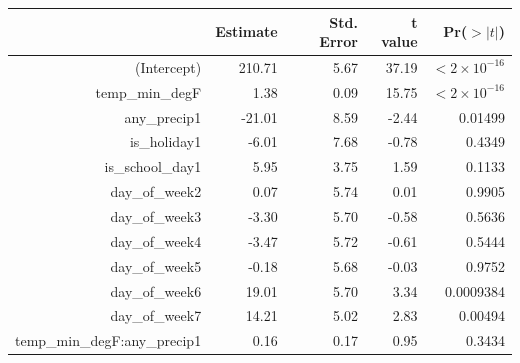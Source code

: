 \documentclass[11pt,notitlepage]{article}
\newenvironment{codeSmall}%
   {\par\noindent\adjustbox{margin=1ex,bgcolor=shadecolor,margin=0ex \medskipamount}\bgroup\minipage\linewidth\verbatim\footnotesize}%
   {\endverbatim\endminipage\egroup}
\begin{document}


\begin{table}[ht]
\footnotesize
\centering
\begin{tabular}{rrrrr}
  \hline
 & Estimate & Std. Error & t value & Pr($>|t|$) \\ 
  \hline
(Intercept) & 210.71 & 5.67 & 37.19 & $<2 \times 10^{-16}$ \\ 
  temp\_min\_degF & 1.38 & 0.09 & 15.75 & $<2 \times 10^{-16}$ \\ 
  any\_precip1 & -21.01 & 8.59 & -2.44 & 0.01499 \\ 
  is\_holiday1 & -6.01 & 7.68 & -0.78 & 0.4349 \\ 
  is\_school\_day1 & 5.95 & 3.75 & 1.59 & 0.1133 \\ 
  day\_of\_week2 & 0.07 & 5.74 & 0.01 & 0.9905 \\ 
  day\_of\_week3 & -3.30 & 5.70 & -0.58 & 0.5636 \\ 
  day\_of\_week4 & -3.47 & 5.72 & -0.61 & 0.5444 \\ 
  day\_of\_week5 & -0.18 & 5.68 & -0.03 & 0.9752 \\ 
  day\_of\_week6 & 19.01 & 5.70 & 3.34 & 0.0009384 \\ 
  day\_of\_week7 & 14.21 & 5.02 & 2.83 & 0.00494 \\ 
  temp\_min\_degF:any\_precip1 & 0.16 & 0.17 & 0.95 & 0.3434 \\ 
   \hline
\end{tabular}
\end{table}
\end{document}
